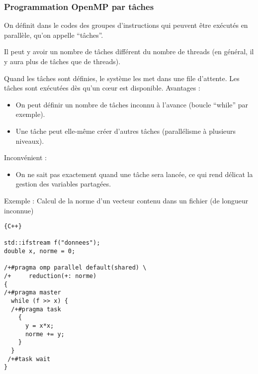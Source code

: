 \documentclass{beamer}
\begin{document}
\begin{frame}[fragile]
	\frametitle{Programmation OpenMP par tâches}

On définit dans le codes des groupes d'instructions qui peuvent être exécutés en parallèle, qu'on appelle ``tâches''. 
\vfill

Il peut y avoir un nombre de tâches différent du nombre de threads (en général, il y aura plus de tâches que de threads).
\vfill
 
Quand les tâches sont définies, le système les met dans une file d'attente. Les tâches sont exécutées dès qu'un c\oe ur est disponible.
\vfill
Avantages : 
\begin{itemize}
	\item On peut définir un nombre de tâches inconnu à l'avance (boucle ``while'' par exemple).
	\item Une tâche peut elle-même créer d'autres tâches (parallélisme à plusieurs niveaux).
\end{itemize}
Inconvénient : 
\begin{itemize}
	\item On ne sait pas exactement quand une tâche sera lancée, ce qui rend délicat la gestion des variables partagées.
\end{itemize}
\end{frame}

\begin{frame}[fragile]
Exemple : Calcul de la norme d'un vecteur contenu dans un fichier
(de longueur inconnue)


\begin{lstlisting}{C++}

std::ifstream f("donnees");
double x, norme = 0;

/+#pragma omp parallel default(shared) \
/+     reduction(+: norme)
{
/+#pragma master
  while (f >> x) {
  /+#pragma task
    {
      y = x*x;
      norme += y;
    }
  }
 /+#task wait
}
\end{lstlisting}

\end{frame}
\end{document}
